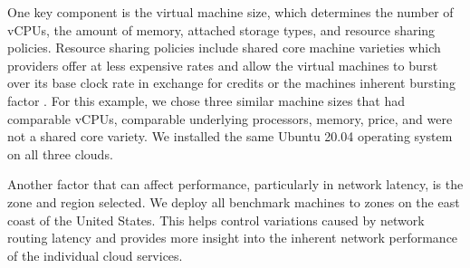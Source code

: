 One key component is the virtual machine size, which determines the
number of vCPUs, the amount of memory, attached storage types, and
resource sharing policies. Resource sharing policies include shared
core machine varieties which providers offer at less expensive rates
and allow the virtual machines to burst over its base clock rate in
exchange for credits or the machines inherent bursting factor
\cite{amazon-instances,google-instances}. For this example, we chose
three similar machine sizes that had comparable vCPUs, comparable
underlying processors, memory, price, and were not a shared core
variety. We installed the same Ubuntu 20.04 operating system on all
three clouds.

Another factor that can affect performance, particularly in network
latency, is the zone and region selected. We deploy all benchmark
machines to zones on the east coast of the United States. This helps
control variations caused by network routing latency and provides more
insight into the inherent network performance of the individual cloud
services.



